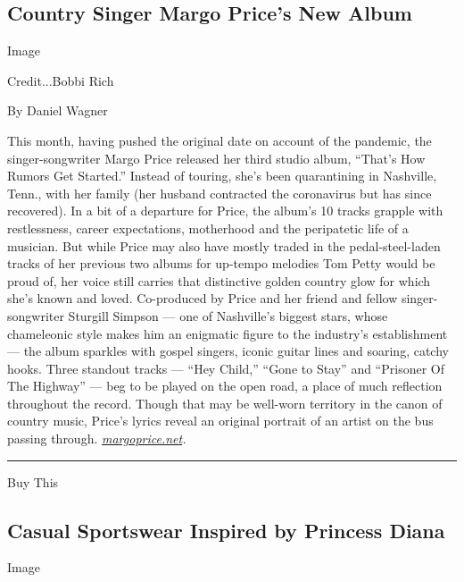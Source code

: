 \hypertarget{country-singer-margo-prices-new-album}{%
\subsection{Country Singer Margo Price's New
Album}\label{country-singer-margo-prices-new-album}}

Image

Credit...Bobbi Rich

By Daniel Wagner

This month, having pushed the original date on account of the pandemic,
the singer-songwriter Margo Price released her third studio album,
``That's How Rumors Get Started.'' Instead of touring, she's been
quarantining in Nashville, Tenn., with her family (her husband
contracted the coronavirus but has since recovered). In a bit of a
departure for Price, the album's 10 tracks grapple with restlessness,
career expectations, motherhood and the peripatetic life of a musician.
But while Price may also have mostly traded in the pedal-steel-laden
tracks of her previous two albums for up-tempo melodies Tom Petty would
be proud of, her voice still carries that distinctive golden country
glow for which she's known and loved. Co-produced by Price and her
friend and fellow singer-songwriter Sturgill Simpson --- one of
Nashville's biggest stars, whose chameleonic style makes him an
enigmatic figure to the industry's establishment --- the album sparkles
with gospel singers, iconic guitar lines and soaring, catchy hooks.
Three standout tracks --- ``Hey Child,'' ``Gone to Stay'' and ``Prisoner
Of The Highway'' --- beg to be played on the open road, a place of much
reflection throughout the record. Though that may be well-worn territory
in the canon of country music, Price's lyrics reveal an original
portrait of an artist on the bus passing through.
\href{http://margoprice.net/}{\emph{margoprice.net}}\emph{.}

\begin{center}\rule{0.5\linewidth}{\linethickness}\end{center}

Buy This

\hypertarget{casual-sportswear-inspired-by-princess-diana}{%
\subsection{Casual Sportswear Inspired by Princess
Diana}\label{casual-sportswear-inspired-by-princess-diana}}

Image

